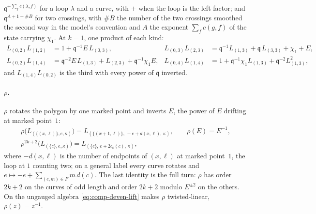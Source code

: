 \documentclass[11pt]{amsart}
\newcommand\fq{\mathfrak{q}}
\theoremstyle{remark}
\begin{document}
$\fq^{\pm\sum_fc(\lambda,f)}$ for a loop $\lambda$ and a curve, with $+$ when the
loop is the left factor; and $\fq^{A+1-\#B}$ for two crossings, with $\#B$ the
number of the two crossings smoothed the second way in the model's convention
and $A$ the exponent $\sum_fc(g,f)$ of the state carrying $\chi_1$.  At $k=1$,
one product of each kind:
\begin{equation}\label{eq:comp-deven-products}
\begin{aligned}
  L_{(0,2)}L_{(1,2)}&=1+\fq^{-1}E\,L_{(0,3)}, &
  L_{(0,3)}L_{(2,3)}&=\fq^{-1}L_{(1,3)}+\fq\,L_{(3,3)}+\chi_1+E,\\
  L_{(0,2)}L_{(1,4)}&=\fq^{-2}E\,L_{(1,3)}+L_{(2,3)}+\fq^{-1}\chi_1E, &
  L_{(0,4)}L_{(1,4)}&=1+\fq^{-1}\chi_1L_{(1,3)}+\fq^{-2}L_{(1,3)}^2,
\end{aligned}
\end{equation}
and $L_{(1,4)}L_{(0,2)}$ is the third with every power of $\fq$ inverted.

\paragraph{$\rho$.}  $\rho$ rotates the polygon by one marked point and
inverts $E$, the power of $E$ drifting at marked point~$1$:
\begin{equation}\label{eq:comp-deven-rho}
\begin{gathered}
  \rho\bigl(L_{(\{(x,\ell)\},e,\kappa)}\bigr)=L_{(\{(x+1,\ell)\},\,-e+d(x,\ell),\,\kappa)},\qquad
  \rho(E)=E^{-1},\\
  \rho^{2k+2}\bigl(L_{(\{c\},e,\kappa)}\bigr)=L_{(\{c\},\,e+2c_0(c),\,\kappa)},
\end{gathered}
\end{equation}
where $-d(x,\ell)$ is the number of endpoints of $(x,\ell)$ at marked
point~$1$, the loop at $1$ counting two; on a general label every curve
rotates and $e\mapsto-e+\sum_{(c,m)\in F}m\,d(c)$.  The last identity is the
full turn: $\rho$ has order $2k+2$ on the curves of odd length and order
$2k+2$ modulo $E^{\pm2}$ on the others.  On the ungauged algebra
\eqref{eq:comp-deven-lift} makes $\rho$ twisted-linear, $\rho(z)=z^{-1}$.
\end{document}
